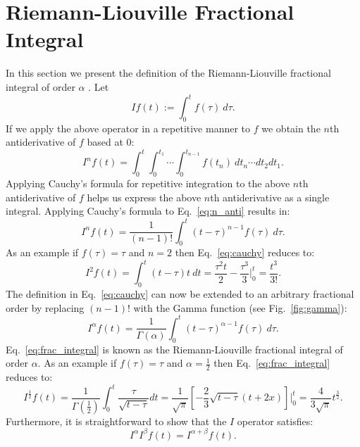 \documentclass{article}
\theoremstyle{theorem}
\theoremstyle{definition}
\begin{document}
\section{Riemann-Liouville Fractional Integral}
In this section we present the definition of the Riemann-Liouville fractional integral of order $\alpha$ \cite{laurent1884}. Let
\begin{equation}
If(t) := \int_0^t f(\tau)~d\tau.
\end{equation}
If we apply the above operator in a repetitive manner to $f$ we obtain the $n$th antiderivative of $f$ based at 0:
\begin{equation}
\label{eq:n_anti}
I^nf(t) = \int_0^t\int_0^{t_1}\cdots \int_0^{t_{n-1}}f(t_n)~dt_n\cdots dt_2 dt_1.
\end{equation}
Applying Cauchy's formula for repetitive integration to the above $n$th antiderivative of $f$ helps us express the above $n$th antiderivative as a single integral. 
Applying Cauchy's formula to Eq.~\eqref{eq:n_anti} results in:
\begin{equation}
\label{eq:cauchy}
I^nf(t) = \frac{1}{(n-1)!}\int_0^t (t-\tau)^{n-1}f(\tau)~d\tau.
\end{equation}
As an example if $f(\tau)=\tau$ and $n=2$ then Eq.~\eqref{eq:cauchy} reduces to:
\begin{equation}
I^2f(t) = \int_0^t (t-\tau)t~dt = \frac{\tau^2 t}{2} - \frac{\tau^3}{3} \Bigg |_0^t = \frac{t^3}{3!}.
\end{equation}
The definition in Eq.~\eqref{eq:cauchy} can now be extended to an arbitrary fractional order by replacing $(n-1)!$ with the Gamma function (see Fig.~\ref{fig:gamma}):
\begin{equation}
\label{eq:frac_integral}
I^{\alpha}f(t) = \frac{1}{\Gamma(\alpha)}\int_0^t (t-\tau)^{\alpha-1}f(\tau)~d\tau.
\end{equation}
Eq.~\eqref{eq:frac_integral} is known as the Riemann-Liouville fractional integral of order $\alpha$. As an example if $f(\tau)=\tau$ and $\alpha=\frac{1}{2}$ then 
Eq.~\eqref{eq:frac_integral} reduces to:
\begin{equation}
I^{\frac{1}{2}}f(t) = \frac{1}{\Gamma(\frac{1}{2})} \int_0^t \frac{\tau}{\sqrt{t-\tau}} dt = \frac{1}{\sqrt{\pi}}\left [ -\frac{2}{3}\sqrt{t-\tau}(t+2x)\right] \Bigg |_0^t=\frac{4}{3\sqrt{\pi}}t^{\frac{3}{2}}. 
\end{equation}
Furthermore, it is straightforward to show that the $I$ operator satisfies:
\begin{equation}
I^{\alpha}I^{\beta}f(t) = I^{\alpha+\beta}f(t). 
\end{equation}
\end{document}
